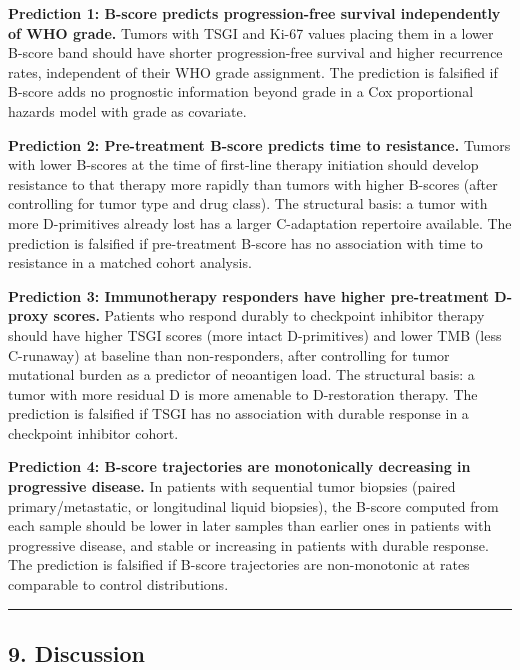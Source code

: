 \documentclass[
  11pt,
  letterpaper,
]{article}
\begin{document}
\textbf{Prediction 1: B-score predicts progression-free survival
independently of WHO grade.} Tumors with TSGI and Ki-67 values placing
them in a lower B-score band should have shorter progression-free
survival and higher recurrence rates, independent of their WHO grade
assignment. The prediction is falsified if B-score adds no prognostic
information beyond grade in a Cox proportional hazards model with grade
as covariate.

\textbf{Prediction 2: Pre-treatment B-score predicts time to
resistance.} Tumors with lower B-scores at the time of first-line
therapy initiation should develop resistance to that therapy more
rapidly than tumors with higher B-scores (after controlling for tumor
type and drug class). The structural basis: a tumor with more
D-primitives already lost has a larger C-adaptation repertoire
available. The prediction is falsified if pre-treatment B-score has no
association with time to resistance in a matched cohort analysis.

\textbf{Prediction 3: Immunotherapy responders have higher pre-treatment
D-proxy scores.} Patients who respond durably to checkpoint inhibitor
therapy should have higher TSGI scores (more intact D-primitives) and
lower TMB (less C-runaway) at baseline than non-responders, after
controlling for tumor mutational burden as a predictor of neoantigen
load. The structural basis: a tumor with more residual D is more
amenable to D-restoration therapy. The prediction is falsified if TSGI
has no association with durable response in a checkpoint inhibitor
cohort.

\textbf{Prediction 4: B-score trajectories are monotonically decreasing
in progressive disease.} In patients with sequential tumor biopsies
(paired primary/metastatic, or longitudinal liquid biopsies), the
B-score computed from each sample should be lower in later samples than
earlier ones in patients with progressive disease, and stable or
increasing in patients with durable response. The prediction is
falsified if B-score trajectories are non-monotonic at rates comparable
to control distributions.

\begin{center}\rule{0.5\linewidth}{0.5pt}\end{center}

\subsection{9. Discussion}\label{discussion}
\end{document}
